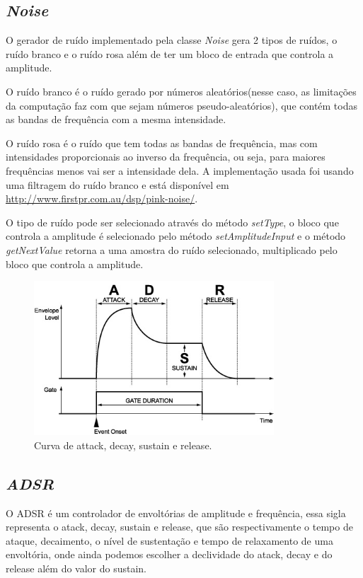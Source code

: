 \documentclass{article}
\begin{document}
\subsection{\emph{Noise}}
O gerador de ruído implementado pela classe \emph{Noise} gera 2 tipos de ruídos, o ruído branco e o ruído rosa além de ter um bloco de entrada que controla a amplitude.


O ruído branco é o ruído gerado por números aleatórios(nesse caso, as limitações da computação faz com que sejam números pseudo-aleatórios),
 que contém todas as bandas de frequência com a mesma intensidade.



O ruído rosa é o ruído que tem todas as bandas de frequência, mas com intensidades proporcionais ao inverso da frequência, ou seja, para maiores
 frequências menos vai ser a intensidade dela. A implementação usada foi usando uma filtragem do ruído branco e está disponível em \url{http://www.firstpr.com.au/dsp/pink-noise/}.


O tipo de ruído pode ser selecionado através do método \emph{setType}, o bloco que controla a amplitude é selecionado pelo método \emph{setAmplitudeInput}
e o método \emph{getNextValue} retorna a uma amostra do ruído selecionado, multiplicado pelo bloco que controla a amplitude.


\begin{figure}
\centering
\includegraphics[width=0.8\textwidth,natwidth=610,natheight=642]{ADSR.jpg}\caption{Curva de attack, decay, sustain e release.}\label{fig:ADSR}
\end{figure}


\subsection{\emph{ADSR}}
O ADSR é um controlador de envoltórias de amplitude e frequência, essa sigla representa o atack, decay, sustain e release, que são 
respectivamente o tempo de ataque, decaimento, o nível de sustentação e tempo de relaxamento de uma envoltória, onde ainda podemos 
escolher a declividade do atack, decay e do release além do valor do sustain.
\end{document}
